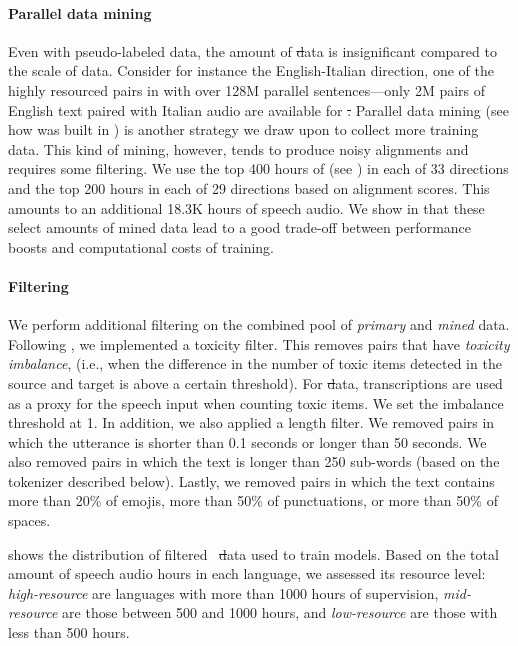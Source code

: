 \paragraph{Parallel data mining}
Even with pseudo-labeled \asr data, the amount of \st data is insignificant compared to the scale of \mt data.
Consider for instance the English-Italian direction, one of the highly resourced pairs in \mt with over 128M parallel sentences—only 2M pairs of English text paired with Italian audio are available for \st.
Parallel data mining (see how \mineddata was built in ) is another strategy we draw upon to collect more training data. 
This kind of mining, however, 
tends to produce noisy alignments and requires some filtering.
We use the top 400 hours 
of \mineddata (see ) in each of 33 \xeng directions and the top 200 hours in each of 29 \engx directions based on \sonar alignment scores.
This amounts to an additional 18.3K hours of speech audio. 
We show in  that these select amounts of mined data lead to a good trade-off between performance boosts and computational costs of training.

\paragraph{Filtering}\label{sec:modeling:filtering}
We perform additional filtering on the combined pool of \textit{primary} and \textit{mined} data.
Following \cite{nllb2022}, we implemented a toxicity filter. This removes pairs that have \emph{toxicity imbalance}, (i.e., when the difference in the number of toxic items detected in the source and target is above a certain threshold). For \st data, transcriptions are used as a proxy for the speech input when counting toxic items. We set the imbalance threshold at 1. 
In addition, we also applied a length filter. We removed pairs in which the utterance is shorter than 0.1 seconds or longer than 50 seconds. We also removed pairs in which the text is longer than 250 sub-words (based on the tokenizer described below). Lastly, we removed pairs in which the text contains more than 20\% of emojis, more than 50\% of punctuations, or more than 50\% of spaces.


 shows the distribution of filtered \xeng~\st data used to train \mfourt models. Based on the total amount of speech audio hours in each language, we assessed its resource level: \textit{high-resource} are languages with more than 1000 hours of supervision, \textit{mid-resource} are those between 500 and 1000 hours, and \textit{low-resource} are those with less than 500 hours.

